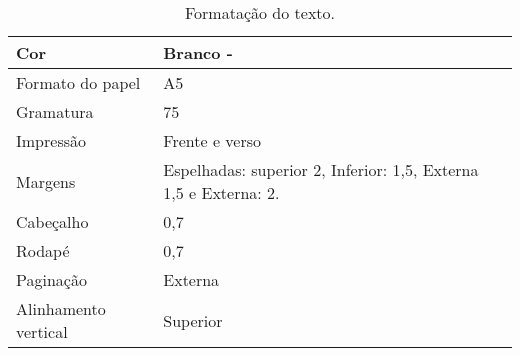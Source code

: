 \begin{table}[!htb]
	\begin{center}
		\caption{Formatação do texto. \showfont}
		\label{tab:a}
		\begin{tabular}{ p{3cm} | p{6cm} }
			\hline
			Cor                            & Branco - \showfont                                                                                                                                                                 \\ \hline
			Formato do papel               & A5                                                                                                                                                                                 \\ \hline
			Gramatura                      & 75                                                                                                                                                                                 \\ \hline
			Impressão                     & Frente e verso                                                                                                                                                                     \\ \hline
			Margens                        & Espelhadas: superior 2, Inferior: 1,5, Externa 1,5 e Externa: 2.                                                                                                                   \\ \hline
			Cabeçalho                     & 0,7                                                                                                                                                                                \\ \hline
			Rodapé                        & 0,7                                                                                                                                                                                \\ \hline
			Paginação                    & Externa                                                                                                                                                                            \\ \hline
			Alinhamento vertical           & Superior                                                                                                                                                                           \\ \hline

\end{tabular}
\end{center}
\end{table}
